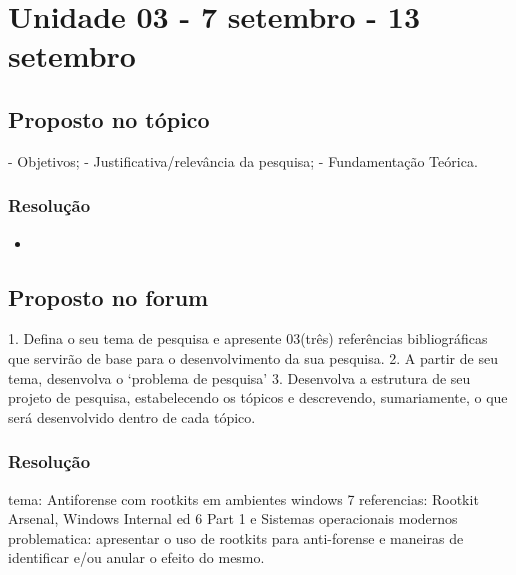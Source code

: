 

\chapter{Unidade 03 - 7 setembro - 13 setembro}

\section{Proposto no tópico}

- Objetivos;
- Justificativa/relevância da pesquisa;
- Fundamentação Teórica.


\subsection{Resolução}


\begin{itemize}
  \item 
\end{itemize}

\section{Proposto no forum}

1. Defina o seu tema de pesquisa e apresente 03(três) referências bibliográficas que servirão de base para o desenvolvimento da sua pesquisa.
2. A partir de seu tema, desenvolva o ‘problema de pesquisa’
3. Desenvolva a estrutura de seu projeto de pesquisa, estabelecendo os tópicos e descrevendo, sumariamente, o que será desenvolvido dentro de cada tópico.

\subsection{Resolução}

tema: Antiforense com rootkits em ambientes windows 7 referencias: Rootkit Arsenal, Windows Internal ed 6 Part 1 e Sistemas operacionais modernos problematica: apresentar o uso de rootkits para anti-forense e maneiras de identificar e/ou anular o efeito do mesmo.

